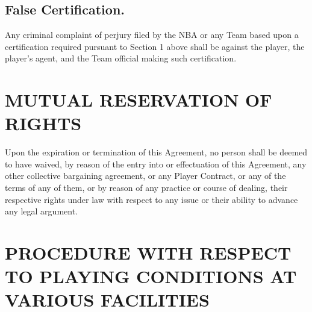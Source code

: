 \documentclass[
]{book}
\begin{document}
\hypertarget{false-certification.}{%
\section{False Certification.}\label{false-certification.}}

Any criminal complaint of perjury filed by the NBA or any Team based upon a certification required pursuant to Section 1 above shall be against the player, the player's agent, and the Team official making such certification.

\hypertarget{mutual-reservation-of-rights}{%
\chapter{MUTUAL RESERVATION OF RIGHTS}\label{mutual-reservation-of-rights}}

Upon the expiration or termination of this Agreement, no person shall be deemed to have waived, by reason of the entry into or effectuation of this Agreement, any other collective bargaining agreement, or any Player Contract, or any of the terms of any of them, or by reason of any practice or course of dealing, their respective rights under law with respect to any issue or their ability to advance any legal argument.

\hypertarget{procedure-with-respect-to-playing-conditions-at-various-facilities}{%
\chapter{PROCEDURE WITH RESPECT TO PLAYING CONDITIONS AT VARIOUS FACILITIES}\label{procedure-with-respect-to-playing-conditions-at-various-facilities}}

\end{document}
